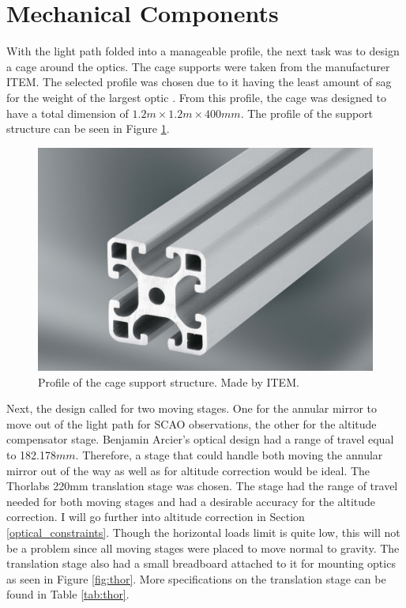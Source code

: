 \section{Mechanical Components}
\label{sec:mech_comp}

With the light path folded into a manageable profile, the next task was to design a
cage around the optics.  The cage supports were taken from the manufacturer ITEM. 
The selected profile was chosen due to it having the least amount of sag for the
weight of the largest optic \cite{item}.  From this profile, the cage was designed
to have a total dimension of $1.2m \times 1.2m \times 400mm$.  The profile of the
support structure can be seen in Figure \ref{fig:item}.  


\begin{figure}[h!]
\centering
\includegraphics[width=10 cm]{Figures/item_profile.jpg}
\caption{Profile of the cage support structure.  Made by ITEM. \cite{item}}
\label{fig:item}
\end{figure}


Next, the design called for two moving stages.  One for the annular mirror to move
out of the light path for SCAO observations, the other for the altitude compensator
stage.  Benjamin Arcier's optical design had a range of travel equal to 182.178$mm$.  Therefore,
a stage that could handle both moving the annular mirror out of the way as well as
for altitude correction would be ideal.  The Thorlabs 220mm translation stage was %
chosen.  The stage had the range of travel needed for both moving stages and had a
desirable accuracy for the altitude correction.  I will go further into altitude correction
in Section \ref{optical_constraints}.  Though the horizontal loads limit
is quite low, this will not be a problem since all moving stages were placed to move
normal to gravity.  The translation stage also had a small breadboard attached to it
for mounting optics as seen in Figure \ref{fig:thor}.  More specifications on the
translation stage can be found in Table \ref{tab:thor}.


